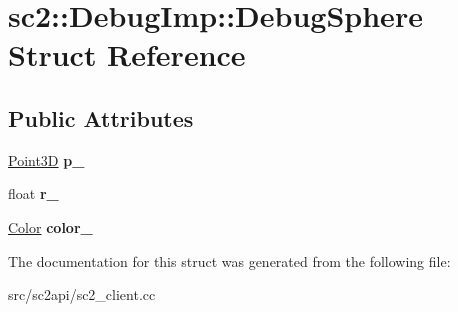 \hypertarget{structsc2_1_1_debug_imp_1_1_debug_sphere}{}\section{sc2\+:\+:Debug\+Imp\+:\+:Debug\+Sphere Struct Reference}
\label{structsc2_1_1_debug_imp_1_1_debug_sphere}
\subsection*{Public Attributes}
\begin{DoxyCompactItemize}
\item 
\mbox{\label{structsc2_1_1_debug_imp_1_1_debug_sphere_ac50427b62234c4fce06a6ce34b284de1}} 
\hyperlink{structsc2_1_1_point3_d}{Point3D} {\bfseries p\+\_\+}
\item 
\mbox{\label{structsc2_1_1_debug_imp_1_1_debug_sphere_a7d60c182562f6d5e9d1d924edc9a36c7}} 
float {\bfseries r\+\_\+}
\item 
\mbox{\label{structsc2_1_1_debug_imp_1_1_debug_sphere_a852aa77409a02938f8e610518c91d061}} 
\hyperlink{structsc2_1_1_color}{Color} {\bfseries color\+\_\+}
\end{DoxyCompactItemize}


The documentation for this struct was generated from the following file\+:\begin{DoxyCompactItemize}
\item 
src/sc2api/sc2\+\_\+client.\+cc\end{DoxyCompactItemize}
